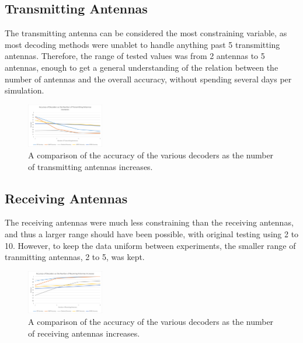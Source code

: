 \documentclass[conference]{IEEEtran}
\begin{document}
\subsection{Transmitting Antennas}
The transmitting antenna can be considered the most constraining variable, as most decoding methods were unablet to handle anything past 5 transmitting antennas. Therefore, the range of tested values was from 2 antennas to 5 antennas, enough to get a general understanding of the relation between the number of antennas and the overall accuracy, without spending several days per simulation.
\begin{figure}[h!]
    \centering
    \includegraphics[width=0.30\textwidth]{NtGraph.png}
    \caption{A comparison of the accuracy of the various decoders as the number of transmitting antennas increases.}
    \label{fig:NtGraph}
\end{figure}

\subsection{Receiving Antennas}
The receiving antennas were much less constraining than the receiving antennas, and thus a larger range should have been possible, with original testing using 2 to 10. However, to keep the data uniform between experiments, the smaller range of tranmitting antennas, 2 to 5, was kept.
\begin{figure}[h!]
    \centering
    \includegraphics[width=0.30\textwidth]{NrGraph.png}
    \caption{A comparison of the accuracy of the various decoders as the number of receiving antennas increases.}
    \label{fig:NrGraph}
\end{figure}
\end{document}
